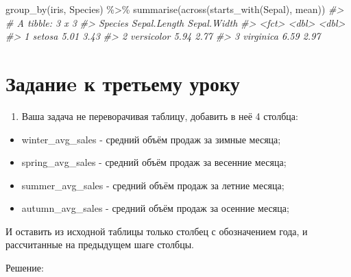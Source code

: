 \documentclass[
]{book}
\newenvironment{Shaded}{\begin{snugshade}}{\end{snugshade}}
\newcommand{\CommentTok}[1]{\textcolor[rgb]{0.56,0.35,0.01}{\textit{#1}}}
\newcommand{\FunctionTok}[1]{\textcolor[rgb]{0.00,0.00,0.00}{#1}}
\newcommand{\NormalTok}[1]{#1}
\newcommand{\SpecialCharTok}[1]{\textcolor[rgb]{0.00,0.00,0.00}{#1}}
\newcommand{\StringTok}[1]{\textcolor[rgb]{0.31,0.60,0.02}{#1}}
\providecommand{\tightlist}{%
  \setlength{\itemsep}{0pt}\setlength{\parskip}{0pt}}
\begin{document}
\begin{Shaded}
\begin{Highlighting}[]
\FunctionTok{group\_by}\NormalTok{(iris, Species) }\SpecialCharTok{\%\textgreater{}\%} 
  \FunctionTok{summarise}\NormalTok{(}\FunctionTok{across}\NormalTok{(}\FunctionTok{starts\_with}\NormalTok{(}\StringTok{\textquotesingle{}Sepal\textquotesingle{}}\NormalTok{), mean))}
\CommentTok{\#\textgreater{} \# A tibble: 3 x 3}
\CommentTok{\#\textgreater{}   Species    Sepal.Length Sepal.Width}
\CommentTok{\#\textgreater{}   \textless{}fct\textgreater{}             \textless{}dbl\textgreater{}       \textless{}dbl\textgreater{}}
\CommentTok{\#\textgreater{} 1 setosa             5.01        3.43}
\CommentTok{\#\textgreater{} 2 versicolor         5.94        2.77}
\CommentTok{\#\textgreater{} 3 virginica          6.59        2.97}
\end{Highlighting}
\end{Shaded}

\hypertarget{ux437ux430ux434ux430ux43dux438e-ux43a-ux442ux440ux435ux442ux44cux435ux43cux443-ux443ux440ux43eux43aux443}{%
\section*{Заданиe к третьему уроку}\label{ux437ux430ux434ux430ux43dux438e-ux43a-ux442ux440ux435ux442ux44cux435ux43cux443-ux443ux440ux43eux43aux443}}

\begin{enumerate}
\def\labelenumi{\arabic{enumi}.}
\tightlist
\item
  Ваша задача не переворачивая таблицу, добавить в неё 4 столбца:
\end{enumerate}

\begin{itemize}
\tightlist
\item
  winter\_avg\_sales - средний объём продаж за зимные месяца;
\item
  spring\_avg\_sales - средний объём продаж за весенние месяца;
\item
  summer\_avg\_sales - средний объём продаж за летние месяца;
\item
  autumn\_avg\_sales - средний объём продаж за осенние месяца;
\end{itemize}

И оставить из исходной таблицы только столбец с обозначением года, и рассчитанные на предыдущем шаге столбцы.

Решение:
\end{document}
